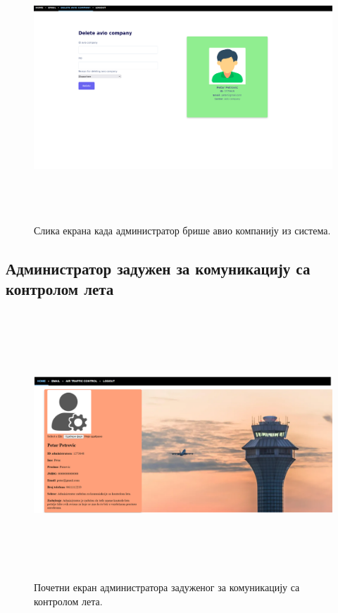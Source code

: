 \documentclass{article}
\begin{document}
\begin{figure}[H]
    \begin{center}
        \includegraphics[width=1.1\textwidth, height=10cm]{Dizajn/delete_avio_company.png}
        \caption{Слика екрана када администратор брише авио компанију из система.}
    \end{center}
\end{figure}

\subsection{Администратор задужен за комуникацију са контролом лета}

\begin{figure}[H]
    \begin{center}
        \includegraphics[width=1.1\textwidth, height=10cm]{Dizajn/home_admin_kontola_leta.png}
        \caption{Почетни екран администратора задуженог за комуникацију са контролом лета.}
    \end{center}
\end{figure}
\end{document}
